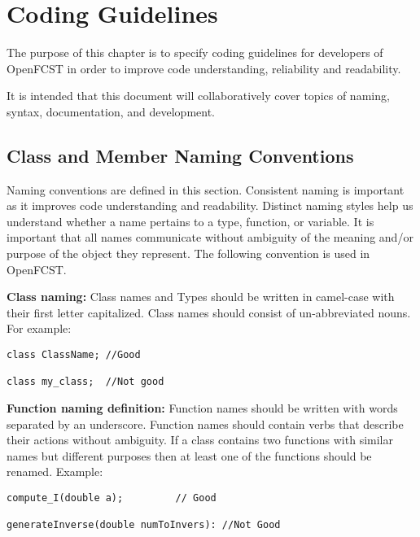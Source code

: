 \chapter{Coding Guidelines}

The purpose of this chapter is to specify coding guidelines for developers of OpenFCST in order to improve code understanding, reliability and readability.

It is intended that this document will collaboratively cover topics of naming, syntax, documentation, and development.

\section{Class and Member Naming Conventions}

Naming conventions are defined in this section. Consistent naming is important as it improves code understanding and readability. Distinct naming styles help us understand whether a name pertains to a type, function, or variable. It is important that all names communicate without ambiguity of the meaning and/or purpose of the object they represent. The following convention is used in OpenFCST.
  
\textbf{Class naming:} Class names and Types should be written in camel-case with their first letter capitalized. Class names should consist of un-abbreviated nouns. For example:
\begin{lstlisting}
class ClassName; //Good

class my_class;  //Not good
\end{lstlisting}

\textbf{Function naming definition:} Function names should be written with words separated by an underscore. Function names should contain verbs that describe their actions without ambiguity. If a class contains two functions with similar names but different purposes then at least one of the functions should be renamed. Example:

\begin{lstlisting}
compute_I(double a); 		 // Good

generateInverse(double numToInvers): //Not Good
\end{lstlisting}

